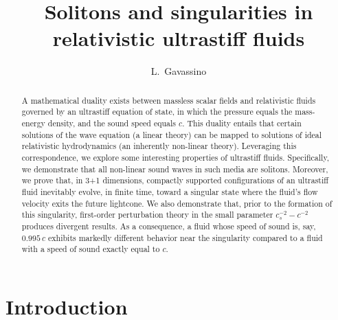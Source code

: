 \documentclass[a4paper, amsfonts, amssymb, amsmath, reprint, showkeys, nofootinbib, twoside,notitlepage,onecolumn]{revtex4-2}
\theoremstyle{definition}
\theoremstyle{theorem}
\theoremstyle{corollary}
\begin{document}
\title{Solitons and singularities in relativistic ultrastiff fluids}
\author{ L.~Gavassino}


\begin{abstract}
A mathematical duality exists between massless scalar fields and relativistic fluids governed by an ultrastiff equation of state, in which the pressure equals the mass-energy density, and the sound speed equals $c$. This duality entails that certain solutions of the wave equation (a linear theory) can be mapped to solutions of ideal relativistic hydrodynamics (an inherently non-linear theory). Leveraging this correspondence, we explore some interesting properties of ultrastiff fluids. Specifically, we demonstrate that all non-linear sound waves in such media are solitons. Moreover, we prove that, in 
3+1 dimensions, compactly supported configurations of an ultrastiff fluid inevitably evolve, in finite time, toward a singular state where the fluid’s flow velocity exits the future lightcone. We also demonstrate that, prior to the formation of this singularity, first-order perturbation theory in the small parameter $c_s^{-2}-c^{-2}$ produces divergent results. As a consequence, a fluid whose speed of sound is, say, $0.995 \, c$ exhibits markedly different behavior near the singularity compared to a fluid with a speed of sound exactly equal to $c$.
\end{abstract} 





\maketitle

\section{Introduction}
\end{document}
